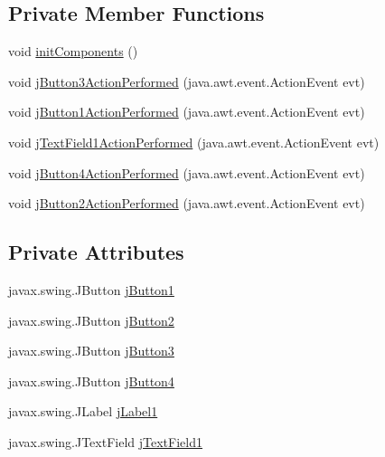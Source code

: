 \subsection*{Private Member Functions}
\begin{DoxyCompactItemize}
\item 
void \mbox{\hyperlink{class_interfaz_1_1_ventana_inicial_a785fb25ee33e60680d1a39a6950235ef}{init\+Components}} ()
\item 
void \mbox{\hyperlink{class_interfaz_1_1_ventana_inicial_a8b32a9edce9bedd6164369c723fc6528}{j\+Button3\+Action\+Performed}} (java.\+awt.\+event.\+Action\+Event evt)
\item 
void \mbox{\hyperlink{class_interfaz_1_1_ventana_inicial_a224f193d5ff7aa5f8e3cd5afcda55570}{j\+Button1\+Action\+Performed}} (java.\+awt.\+event.\+Action\+Event evt)
\item 
void \mbox{\hyperlink{class_interfaz_1_1_ventana_inicial_a9c3c5c3a37751a96caad2531a6c8faf5}{j\+Text\+Field1\+Action\+Performed}} (java.\+awt.\+event.\+Action\+Event evt)
\item 
void \mbox{\hyperlink{class_interfaz_1_1_ventana_inicial_a5ee4902a6b0e2dcfa91641cdef1b318b}{j\+Button4\+Action\+Performed}} (java.\+awt.\+event.\+Action\+Event evt)
\item 
void \mbox{\hyperlink{class_interfaz_1_1_ventana_inicial_a979092d824f639fd81891bcdf5351cbb}{j\+Button2\+Action\+Performed}} (java.\+awt.\+event.\+Action\+Event evt)
\end{DoxyCompactItemize}
\subsection*{Private Attributes}
\begin{DoxyCompactItemize}
\item 
javax.\+swing.\+J\+Button \mbox{\hyperlink{class_interfaz_1_1_ventana_inicial_a0c01fdde6aa59c4e947850d3d89ece3a}{j\+Button1}}
\item 
javax.\+swing.\+J\+Button \mbox{\hyperlink{class_interfaz_1_1_ventana_inicial_ac8ea3e51a862b7978b078d694528cdc5}{j\+Button2}}
\item 
javax.\+swing.\+J\+Button \mbox{\hyperlink{class_interfaz_1_1_ventana_inicial_af37a09af6b2d616c14a3d77d835eb34d}{j\+Button3}}
\item 
javax.\+swing.\+J\+Button \mbox{\hyperlink{class_interfaz_1_1_ventana_inicial_ad0c38a518bd73dd033484143f67a8c2b}{j\+Button4}}
\item 
javax.\+swing.\+J\+Label \mbox{\hyperlink{class_interfaz_1_1_ventana_inicial_a9d48c0b63de7cec55a4caed1f4feb13c}{j\+Label1}}
\item 
javax.\+swing.\+J\+Text\+Field \mbox{\hyperlink{class_interfaz_1_1_ventana_inicial_a45365129af4acf435140853b35aec365}{j\+Text\+Field1}}
\end{DoxyCompactItemize}


